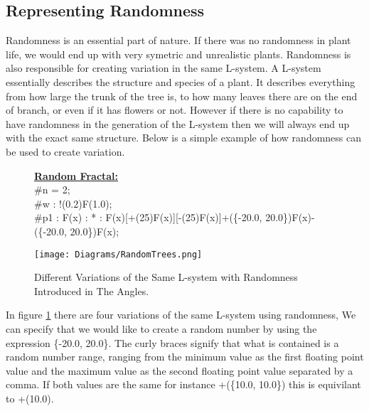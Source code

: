 \subsection{Representing Randomness} \label{Randomness L-system Subsection}

\begin{flushleft}

Randomness is an essential part of nature. If there was no randomness in plant life, we would end up with very symetric and unrealistic plants. Randomness is also responsible for creating variation in the same L-system. A L-system essentially describes the structure and species of a plant. It describes everything from how large the trunk of the tree is, to how many leaves there are on the end of branch, or even if it has flowers or not. However if there is no capability to have randomness in the generation of the L-system then we will always end up with the exact same structure. 
\vspace{5mm}
Below is a simple example of how randomness can be used to create variation.

\end{flushleft}   

\begin{figure}[htbp]
	\raggedright
	\textbf{\underline{Random Fractal:}} \\
	\#n = 2; \\
	\#w : !(0.2)F(1.0); \\
	\#p1 : F(x) : * : F(x)[+(25)F(x)][-(25)F(x)]+(\{-20.0, 20.0\})F(x)-(\{-20.0, 20.0\})F(x);\\
	\vspace{10mm}
	{\centering
		\vspace{7px}
		\texttt{[image: Diagrams/RandomTrees.png]}
		\caption{Different Variations of the Same L-system with Randomness Introduced in The Angles. \label{figRandomness}}
	}
\end{figure}
\FloatBarrier

\begin{flushleft}

In figure \ref{figRandomness} there are four variations of the same L-system using randomness, We can specify that we would like to create a random number by using the expression \{-20.0, 20.0\}. The curly braces signify that what is contained is a random number range, ranging from the minimum value as the first floating point value and the maximum value as the second floating point value separated by a comma. If both values are the same for instance +(\{10.0, 10.0\}) this is equivilant to +(10.0).

\end{flushleft}

